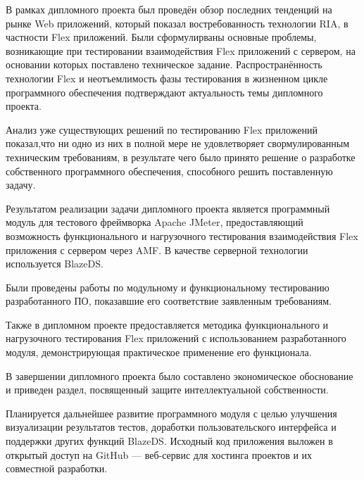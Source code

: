 \Conclusion

В рамках дипломного проекта был проведён обзор последних тенденций на рынке Web приложений, который
показал востребованность технологии RIA, в частности Flex приложений. Были сформулирваны основные проблемы,
возникающие при тестировании взаимодействия Flex приложений с сервером, на основании которых
поставлено техническое задание. Распространённость технологии
Flex и неотъемлимость фазы тестирования в жизненном цикле программного обеспечения подтверждают
актуальность темы дипломного проекта.

Анализ уже существующих решений по тестированию Flex приложений показал,что ни одно из них в полной мере не
удовлетворяет свормулированным техническим требованиям, в результате чего было принято решение о разработке
собственного программного обеспечения, способного решить поставленную задачу.

Результатом реализации задачи дипломного проекта является программный модуль для тестового фреймворка
Apache JMeter, предоставляющий возможность функционального и нагрузочного тестирования взаимодействия Flex
приложения с сервером через AMF. В качестве серверной технологии используется BlazeDS.

Были проведены работы по модульному и функциональному тестированию разработанного ПО, показавшие его соответствие
заявленным требованиям.

Также в дипломном проекте предоставляется методика функционального и нагрузочного тестирования Flex приложений с использованием разработанного модуля,
демонстрирующая практическое применение его функционала.

В завершении дипломного проекта было составлено экономическое обоснование и приведен раздел,
посвященный защите интеллектуальной собственности.

Планируется дальнейшее развитие программного модуля с целью улучшения визуализации результатов тестов,
доработки пользовательского интерфейса и поддержки других функций BlazeDS. Исходный код приложения выложен в открытый
доступ на GitHub --- веб-сервис для хостинга проектов и их совместной разработки.

